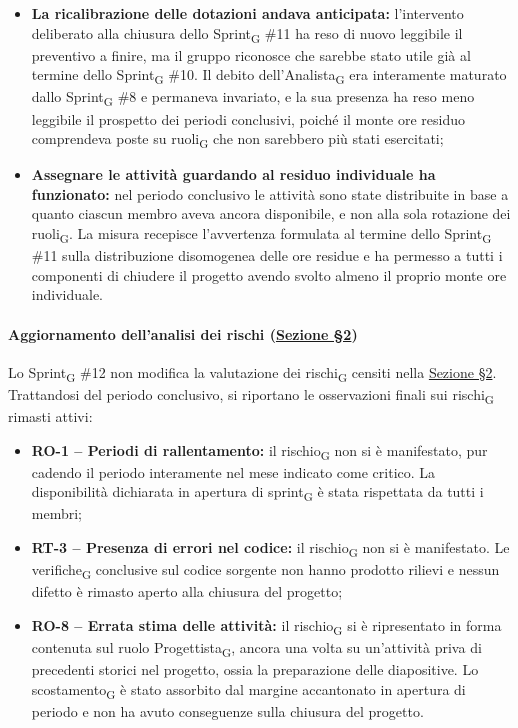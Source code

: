 ﻿\documentclass[a4paper, 10pt, colorlinks=true, linkcolor=black, urlcolor=blue, citecolor=blue, hidelinks]{article}
\begin{document}
\begin{itemize}
    \item \textbf{La ricalibrazione delle dotazioni andava anticipata:} l'intervento deliberato alla chiusura dello Sprint\textsubscript{G} \#11 ha reso di nuovo leggibile il preventivo a finire, ma il gruppo riconosce che sarebbe stato utile già al termine dello Sprint\textsubscript{G} \#10. Il debito dell'Analista\textsubscript{G} era interamente maturato dallo Sprint\textsubscript{G} \#8 e permaneva invariato, e la sua presenza ha reso meno leggibile il prospetto dei periodi conclusivi, poiché il monte ore residuo comprendeva poste su ruoli\textsubscript{G} che non sarebbero più stati esercitati;

    \item \textbf{Assegnare le attività guardando al residuo individuale ha funzionato:} nel periodo conclusivo le attività sono state distribuite in base a quanto ciascun membro aveva ancora disponibile, e non alla sola rotazione dei ruoli\textsubscript{G}. La misura recepisce l'avvertenza formulata al termine dello Sprint\textsubscript{G} \#11 sulla distribuzione disomogenea delle ore residue e ha permesso a tutti i componenti di chiudere il progetto avendo svolto almeno il proprio monte ore individuale.
\end{itemize}

\paragraph{Aggiornamento dell'analisi dei rischi (\hyperref[tab:gestione-rischi]{Sezione \S2})}
Lo Sprint\textsubscript{G} \#12 non modifica la valutazione dei rischi\textsubscript{G} censiti nella \hyperref[tab:gestione-rischi]{Sezione \S2}. Trattandosi del periodo conclusivo, si riportano le osservazioni finali sui rischi\textsubscript{G} rimasti attivi:
\begin{itemize}
    \item \textbf{RO-1 -- Periodi di rallentamento:} il rischio\textsubscript{G} non si è manifestato, pur cadendo il periodo interamente nel mese indicato come critico. La disponibilità dichiarata in apertura di sprint\textsubscript{G} è stata rispettata da tutti i membri;

    \item \textbf{RT-3 -- Presenza di errori nel codice:} il rischio\textsubscript{G} non si è manifestato. Le verifiche\textsubscript{G} conclusive sul codice sorgente non hanno prodotto rilievi e nessun difetto è rimasto aperto alla chiusura del progetto;

    \item \textbf{RO-8 -- Errata stima delle attività:} il rischio\textsubscript{G} si è ripresentato in forma contenuta sul ruolo Progettista\textsubscript{G}, ancora una volta su un'attività priva di precedenti storici nel progetto, ossia la preparazione delle diapositive. Lo scostamento\textsubscript{G} è stato assorbito dal margine accantonato in apertura di periodo e non ha avuto conseguenze sulla chiusura del progetto.
\end{itemize}
\end{document}

